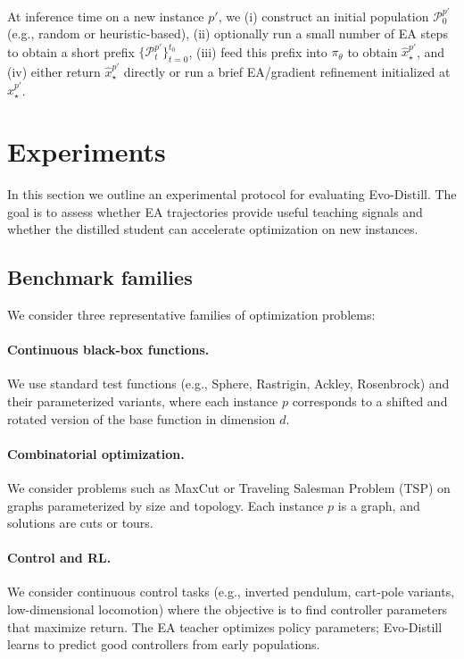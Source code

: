 \documentclass{article}
\begin{document}
At inference time on a new instance $p'$, we (i) construct an initial population $\mathcal{P}_0^{p'}$ (e.g., random or heuristic-based), (ii) optionally run a small number of EA steps to obtain a short prefix $\{\mathcal{P}_t^{p'}\}_{t=0}^{t_0}$, (iii) feed this prefix into $\pi_\theta$ to obtain $\hat{x}_\star^{p'}$, and (iv) either return $\hat{x}_\star^{p'}$ directly or run a brief EA/gradient refinement initialized at $\hat{x}_\star^{p'}$.

\section{Experiments}
\label{sec:experiments}

In this section we outline an experimental protocol for evaluating Evo-Distill. The goal is to assess whether EA trajectories provide useful teaching signals and whether the distilled student can accelerate optimization on new instances.

\subsection{Benchmark families}

We consider three representative families of optimization problems:

\paragraph{Continuous black-box functions.}
We use standard test functions (e.g., Sphere, Rastrigin, Ackley, Rosenbrock) and their parameterized variants, where each instance $p$ corresponds to a shifted and rotated version of the base function in dimension $d$.

\paragraph{Combinatorial optimization.}
We consider problems such as MaxCut or Traveling Salesman Problem (TSP) on graphs parameterized by size and topology. Each instance $p$ is a graph, and solutions are cuts or tours.

\paragraph{Control and RL.}
We consider continuous control tasks (e.g., inverted pendulum, cart-pole variants, low-dimensional locomotion) where the objective is to find controller parameters that maximize return. The EA teacher optimizes policy parameters; Evo-Distill learns to predict good controllers from early populations.
\end{document}
